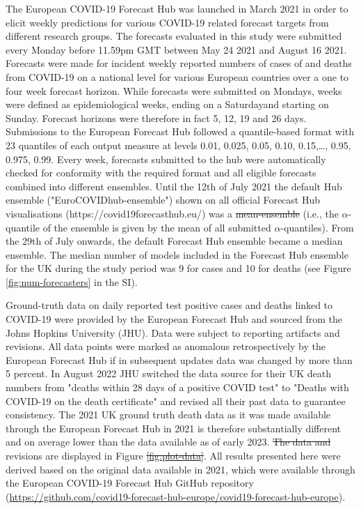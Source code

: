 \documentclass[10pt,a4paper,twocolumn]{article}
\providecommand{\DIFaddtex}[1]{{\protect\color{blue}\uwave{#1}}} %
\providecommand{\DIFdeltex}[1]{{\protect\color{red}\sout{#1}}}                      %
\providecommand{\DIFaddbegin}{} %
\providecommand{\DIFaddend}{} %
\providecommand{\DIFdelbegin}{} %
\providecommand{\DIFdelend}{} %
\providecommand{\DIFadd}[1]{\texorpdfstring{\DIFaddtex{#1}}{#1}} %
\providecommand{\DIFdel}[1]{\texorpdfstring{\DIFdeltex{#1}}{}} %
\begin{document}
The European COVID-19 Forecast Hub \cite{sherrattPredictivePerformanceMultimodel2022} was launched in March 2021 in order to elicit weekly predictions for various COVID-19 related forecast targets from different research groups. The forecasts evaluated in this study were submitted every Monday before 11.59pm GMT between May 24 2021 and August 16 2021. Forecasts were made for incident weekly reported numbers of cases of and deaths from COVID-19 on a national level for various European countries over a one to four week forecast horizon. While forecasts were submitted on Mondays, weeks were defined as epidemiological weeks, ending on a Saturday\DIFaddbegin \DIFadd{, }\DIFaddend and starting on Sunday. Forecast horizons were therefore in fact 5, 12, 19 and 26 days. Submissions to the European Forecast Hub followed a quantile-based format with 23 quantiles of each output measure at levels 0.01, 0.025, 0.05, 0.10, 0.15,…, 0.95, 0.975, 0.99.
Every week, forecasts submitted to the hub were automatically checked for conformity with the required format and all eligible forecasts combined into different ensembles. Until the 12th of July 2021 the default Hub ensemble ("EuroCOVIDhub-ensemble") shown on all official Forecast Hub visualisations (https://covid19forecasthub.eu/) was a \DIFdelbegin \DIFdel{mean-ensemble }\DIFdelend \DIFaddbegin \DIFadd{mean ensemble }\DIFaddend (i.e., the $\alpha$-quantile of the ensemble is given by the mean of all submitted $\alpha$-quantiles). From the 29th of July onwards, the default Forecast Hub ensemble became a median ensemble. The median number of models included in the Forecast Hub ensemble for the UK during the study period was 9 for cases and 10 for deaths (see Figure \ref{fig:num-forecasters} in the SI). 

Ground-truth data on daily reported test positive cases and deaths linked to COVID-19 were provided by the European Forecast Hub and sourced from the Johns Hopkins University (JHU). Data were subject to reporting artifacts and revisions. All data points were marked as anomalous retrospectively by the European Forecast Hub if in subsequent updates data was changed by more than 5 percent. In August 2022 JHU switched the data source for their UK death numbers from "deaths within 28 days of a positive COVID test" to "Deaths with COVID-19 on the death certificate" and revised all their past data to guarantee consistency. The 2021 UK ground truth death data as it was made available through the European Forecast Hub in 2021 is therefore substantially different and on average lower than the data available as of early 2023. \DIFdelbegin \DIFdel{The data and }\DIFdelend \DIFaddbegin \DIFadd{Data }\DIFaddend revisions are displayed in Figure \DIFdelbegin \DIFdel{\ref{fig:plot-data}}\DIFdelend \DIFaddbegin \DIFadd{2 in the Supplementary Information \mbox{%
\cite{bosseSupplementaryInformationHuman2023}}\hskip0pt%
}\DIFaddend . All results presented here were derived based on the original data available in 2021, which were available through the European COVID-19 Forecast Hub GitHub repository (\url{https://github.com/covid19-forecast-hub-europe/covid19-forecast-hub-europe}). 
\end{document}
